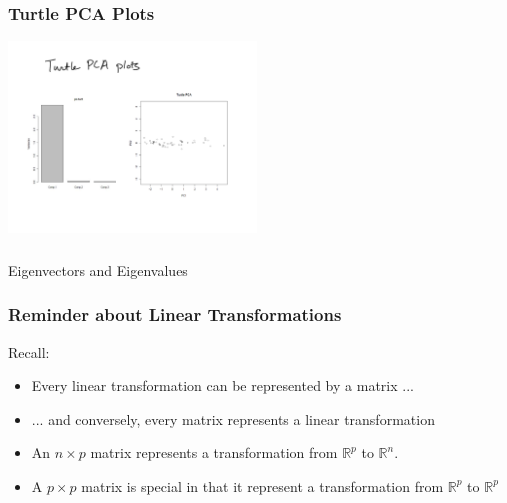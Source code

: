 \documentclass{beamer}
\newcommand{\RealN}{\ensuremath{\mathbb{R}^n}}
\newcommand{\RealP}{\ensuremath{\mathbb{R}^p}}
\begin{document}
\begin{frame}
  \frametitle{Turtle PCA Plots}

\begin{center}
\includegraphics[height=2in]{turtle-pca}
\end{center}
\end{frame}




\begin{frame}
  \frametitle{}

\begin{center}
\begin{Huge}
Eigenvectors and Eigenvalues
\end{Huge}
\end{center}
\end{frame}

\begin{frame}
  \frametitle{Reminder about Linear Transformations}

Recall:

\begin{itemize}
\item Every linear transformation can be represented by a matrix ...

\item ... and conversely, every matrix represents a linear transformation

\item An $n \times p$ matrix represents a transformation from $\RealP$ to $\RealN$.

\item A $p \times p$ matrix is special in that it represent a transformation from $\RealP$ to $\RealP$

\end{itemize}


\end{frame}
\end{document}
